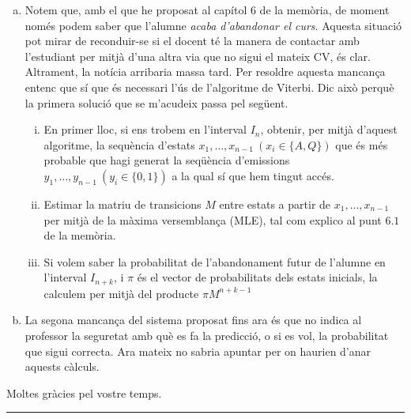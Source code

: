\documentclass[
	a4paper,
	twoside,
	justified
]{tufte-handout}
\begin{document}
\begin{enumerate}[(a)]
  \item Notem que, amb el que he proposat al capítol 6 de la memòria, de moment només podem saber que l'alumne \emph{acaba d'abandonar el curs}. Aquesta situació pot mirar de reconduir-se si el docent té la manera de contactar amb l'estudiant per mitjà d'una altra via que no sigui el mateix CV, és clar. Altrament, la notícia arribaria massa tard. Per resoldre aquesta mancança entenc que sí que és necessari l'ús de l'algoritme de Viterbi. Dic això perquè la primera solució que se m'acudeix passa pel següent.
  \begin{enumerate}[(i)]
  \item En primer lloc, si ens trobem en l'interval $I_n$, obtenir, per mitjà d'aquest algoritme, la sequència d'estats $x_1,\ldots,x_{n-1} \> (x_i \in \{A,Q\})$ que és més probable que hagi generat la seqüència d'emissions $y_1, \ldots, y_{n-1} \> (y_i \in \{0,1\})$ a la qual sí que hem tingut accés. 
  \item Estimar la matriu de transicions $M$ entre estats a partir de $x_1,\ldots,x_{n-1}$ per mitjà de la màxima versemblança (MLE), tal com explico al punt $6.1$ de la memòria. 
  \item Si volem saber la probabilitat de l'abandonament futur de l'alumne en l'interval $I_{n+k}$, i $\pi$ és el vector de probabilitats dels estats inicials, la calculem per mitjà del producte $\pi M^{n+k-1}$     
  \end{enumerate} 
  \item La segona mancança del sistema proposat fins ara és que no indica al professor la seguretat amb què es fa la predicció, o si es vol, la probabilitat que sigui correcta. Ara mateix no sabria apuntar per on haurien d'anar aquests càlculs.  
\end{enumerate}
           

\noindent Moltes gràcies pel vostre temps.

\noindent\rule{4cm}{0.4pt}


\end{document}
